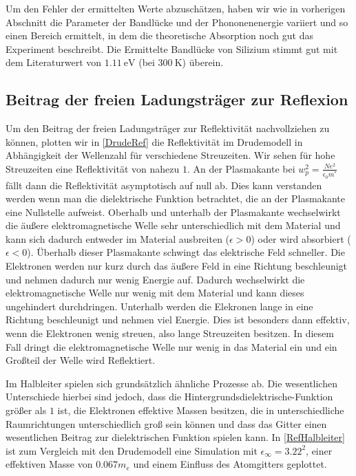 \documentclass[paper=a4,fontsize=10pt,DIV=18,twocolumn,parskip=half]{scrartcl}
\numberwithin{equation}{section}    %
\begin{document}
Um den Fehler der ermittelten Werte abzuschätzen, haben wir wie in vorherigen Abschnitt die Parameter der Bandlücke und der Phononenenergie variiert und so einen Bereich ermittelt, in dem die theoretische Absorption noch gut das Experiment beschreibt.
Die Ermittelte Bandlücke von Silizium stimmt gut mit dem Literaturwert von $\SI{1.11}{\eV}$ \cite{kittel} (bei $\SI{300}{\K}$) überein.

\subsection{Beitrag der freien Ladungsträger zur Reflexion}

Um den Beitrag der freien Ladungsträger zur Reflektivität nachvollziehen zu können, plotten wir in \cref{DrudeRef} die Reflektivität im Drudemodell in Abhängigkeit der Wellenzahl für verschiedene Streuzeiten. Wir sehen für hohe Streuzeiten eine Reflektivität von nahezu $1$. An der Plasmakante bei $ w_p^2=\frac{N e^2}{\epsilon_0 m^*}$ fällt dann die Reflektivität asymptotisch auf null ab. Dies kann verstanden werden  wenn man die dielektrische Funktion betrachtet, die an der Plasmakante eine Nullstelle aufweist. Oberhalb und unterhalb der Plasmakante wechselwirkt die äußere elektromagnetische Welle sehr unterschiedlich mit dem Material und kann sich dadurch entweder im Material ausbreiten ($\epsilon > 0$) oder wird absorbiert ($\epsilon < 0$). Überhalb dieser Plasmakante schwingt das elektrische Feld schneller. Die Elektronen werden nur kurz durch das äußere Feld in eine Richtung beschleunigt und nehmen dadurch nur wenig Energie auf. Dadurch wechselwirkt die elektromagnetische Welle
nur wenig mit dem Material und kann dieses ungehindert durchdringen. Unterhalb werden die Elekronen lange in eine Richtung beschleunigt und nehmen viel Energie. Dies ist besonders dann effektiv, wenn die Elektronen wenig streuen, also lange Streuzeiten besitzen. In diesem Fall dringt die elektromagnetische Welle nur wenig in das Material ein und ein Großteil der Welle wird Reflektiert.

Im Halbleiter spielen sich grundsätzlich ähnliche Prozesse ab. Die wesentlichen Unterschiede hierbei sind jedoch, dass die Hintergrundsdielektrische-Funktion größer als $1$ ist, die Elektronen effektive Massen besitzen, die in unterschiedliche Raumrichtungen unterschiedlich groß sein können und dass das Gitter einen wesentlichen Beitrag zur dielektrischen Funktion spielen kann. In \ref{RefHalbleiter} ist zum Vergleich mit den Drudemodell eine Simulation mit $\epsilon_\infty=3.22^2$, einer effektiven Masse von $0.067m_e$ und einem Einfluss des Atomgitters geplottet.
\end{document}
